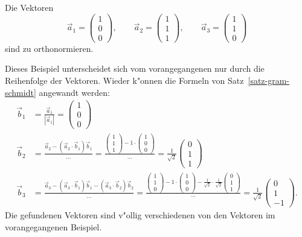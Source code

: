 \begin{beispiel}
Die Vektoren
\[
\vec a_1=\begin{pmatrix}1\\0\\0\end{pmatrix},\qquad
\vec a_2=\begin{pmatrix}1\\1\\1\end{pmatrix},\qquad
\vec a_3=\begin{pmatrix}1\\1\\0\end{pmatrix}
\]
sind zu orthonormieren.

Dieses Beispiel unterscheidet sich vom vorangegangenen nur
durch die Reihenfolge der Vektoren.
Wieder k"onnen die Formeln von Satz~\ref{satz-gram-schmidt} angewandt werden:
\begin{align*}
\vec b_1&=\frac{\vec a_1}{|\vec a_1|}=\begin{pmatrix}1\\0\\0\end{pmatrix}
\\
\vec b_2
&=
\frac{\vec a_2-(\vec a_2\cdot \vec b_1)\vec b_1}{\dots}
=
\frac{\begin{pmatrix}1\\1\\1\end{pmatrix}-1\cdot\begin{pmatrix}1\\0\\0\end{pmatrix}}{\dots}=\frac1{\sqrt{2}}\begin{pmatrix}0\\1\\1\end{pmatrix}
\\
\vec b_3
&=
\frac{\vec a_3-(\vec a_3\cdot\vec b_1)\vec b_1-(\vec a_3\cdot\vec b_2)\vec b_2}{\dots}
=\frac{\begin{pmatrix}1\\1\\0\end{pmatrix}-1\cdot\begin{pmatrix}1\\0\\0\end{pmatrix}-\frac1{\sqrt{2}}\cdot\frac1{\sqrt{2}}\begin{pmatrix}0\\1\\1\end{pmatrix} }{\cdots}
=\frac{1}{\sqrt{2}}\begin{pmatrix}0\\1\\-1\end{pmatrix}.
\end{align*}
Die gefundenen Vektoren sind v"ollig verschiedenen von den Vektoren
im vorangegangenen Beispiel.
\end{beispiel}

